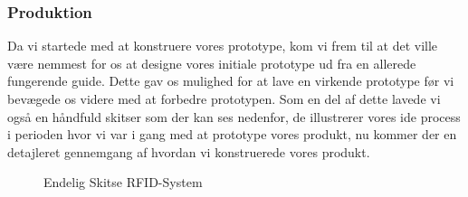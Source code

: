     \subsubsection{Produktion}
    Da vi startede med at konstruere vores prototype, kom vi frem til at det ville være nemmest for os at designe vores initiale prototype ud fra en allerede fungerende guide. Dette gav os mulighed for at lave en virkende
    prototype før vi bevægede os videre med at forbedre prototypen. Som en del af dette lavede vi også en håndfuld skitser som der kan ses nedenfor, de illustrerer vores ide process i perioden hvor vi var i gang med at prototype vores produkt,
    nu kommer der en detajleret gennemgang af hvordan vi konstruerede vores produkt.
    \begin{figure}[H]
        \centering
        \caption{Endelig Skitse RFID-System}
    \end{figure}
    \newpage
